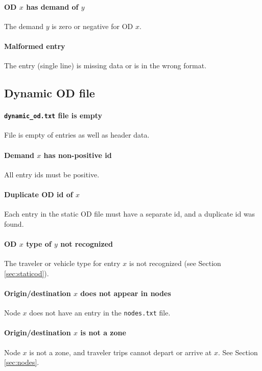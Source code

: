\paragraph*{OD $x$ has demand of $y$}
The demand $y$ is zero or negative for OD $x$.

\paragraph*{Malformed entry}
The entry (single line) is missing data or is in the wrong format.




\subsection{Dynamic OD file}

\paragraph*{\texttt{dynamic\_od.txt} file is empty}
File is empty of entries as well as header data.

\paragraph*{Demand $x$ has non-positive id}
All entry ids must be positive.

\paragraph*{Duplicate OD id of $x$}
Each entry in the static OD file must have a separate id, and a duplicate id was found.

\paragraph*{OD $x$ type of $y$ not recognized}
The traveler or vehicle type for entry $x$ is not recognized (see Section \ref{sec:staticod}).

\paragraph*{Origin/destination $x$ does not appear in nodes}
Node $x$ does not have an entry in the \texttt{nodes.txt} file.

\paragraph*{Origin/destination $x$ is not a zone}
Node $x$ is not a zone, and traveler trips cannot depart or arrive at $x$. See Section \ref{sec:nodes}.

